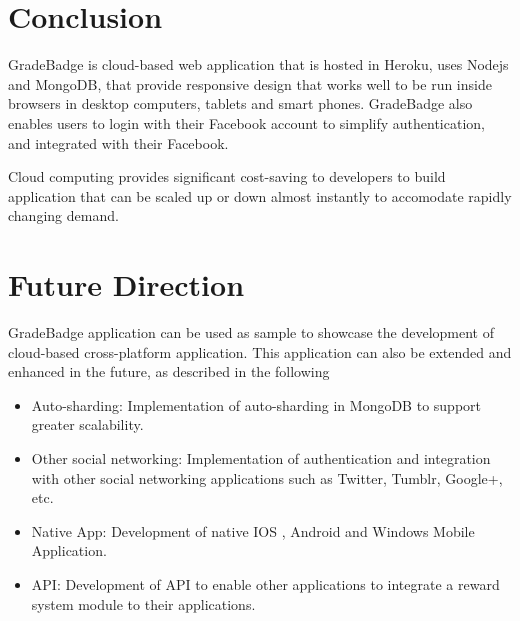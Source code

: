 
\section{Conclusion}

GradeBadge is cloud-based web application that is hosted in Heroku, uses Nodejs and MongoDB, that provide responsive design that works well to be run inside browsers in desktop computers, tablets and smart phones. GradeBadge also enables users to login with their Facebook account to simplify authentication, and integrated with their Facebook. 

Cloud computing provides significant cost-saving to developers to build application that can be scaled up or down almost instantly to accomodate rapidly changing demand.

\section{Future Direction}

GradeBadge application can be used as sample to showcase the development of cloud-based cross-platform application. This application can also be extended and enhanced in the future, as described in the following 

\begin{itemize}
\item Auto-sharding: Implementation of auto-sharding in MongoDB to support greater scalability. 
\item Other social networking: Implementation of authentication and integration with other social networking applications such as Twitter, Tumblr, Google+,  etc. 
\item Native App: Development of native IOS , Android and Windows Mobile Application.
\item API: Development of API to enable other applications to integrate a reward system module to their applications.
\end{itemize}